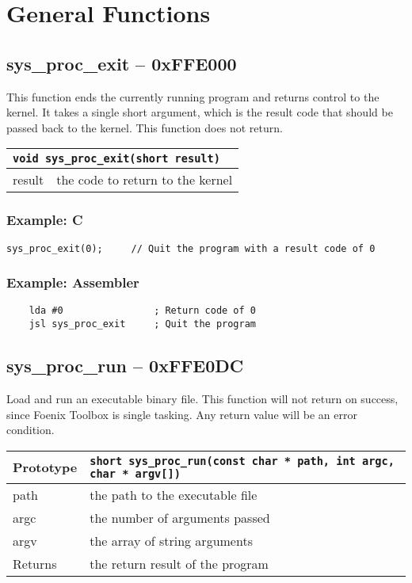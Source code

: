 \section{General Functions}

\subsection*{sys\_proc\_exit -- 0xFFE000}
This function ends the currently running program and returns control to the kernel. It takes a single short argument, which is the result code that should be passed back to the kernel. This function does not return.

\bigskip

\begin{tabular}{|l|l|} \hline
\multicolumn{2}{|l|}{\lstinline!void sys_proc_exit(short result)!} \\ \hline\hline
result    & the code to return to the kernel \\ \hline
\end{tabular}

\subsubsection*{Example: C}
\begin{lstlisting}
sys_proc_exit(0);     // Quit the program with a result code of 0
\end{lstlisting}

\subsubsection*{Example: Assembler}
\begin{verbatim}
    lda #0                ; Return code of 0
    jsl sys_proc_exit     ; Quit the program
\end{verbatim}

\subsection*{sys\_proc\_run -- 0xFFE0DC}
Load and run an executable binary file.
This function will not return on success, since Foenix Toolbox is single tasking.
Any return value will be an error condition.

\bigskip

\begin{tabular}{|l||l|} \hline
Prototype & \lstinline!short sys_proc_run(const char * path, int argc, char * argv[])! \\ \hline
path & the path to the executable file \\ \hline
argc & the number of arguments passed \\ \hline
argv & the array of string arguments \\ \hline
Returns & the return result of the program \\ \hline
\end{tabular}

